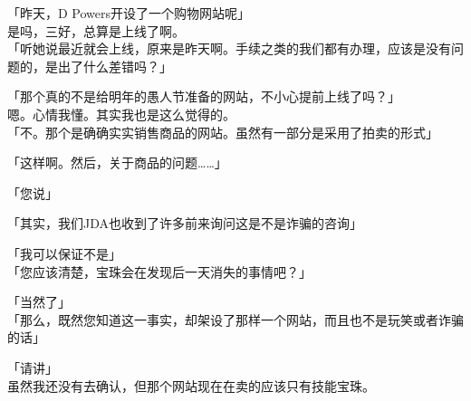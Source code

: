 「昨天，D Powers开设了一个购物网站呢」\\

是吗，三好，总算是上线了啊。\\

「听她说最近就会上线，原来是昨天啊。手续之类的我们都有办理，应该是没有问题的，是出了什么差错吗？」

「那个真的不是给明年的愚人节准备的网站，不小心提前上线了吗？」\\

嗯。心情我懂。其实我也是这么觉得的。\\

「不。那个是确确实实销售商品的网站。虽然有一部分是采用了拍卖的形式」

「这样啊。然后，关于商品的问题……」

「您说」

「其实，我们JDA也收到了许多前来询问这是不是诈骗的咨询」

「我可以保证不是」\\

「您应该清楚，宝珠会在发现后一天消失的事情吧？」

「当然了」\\

「那么，既然您知道这一事实，却架设了那样一个网站，而且也不是玩笑或者诈骗的话」

「请讲」\\

虽然我还没有去确认，但那个网站现在在卖的应该只有技能宝珠。\\

